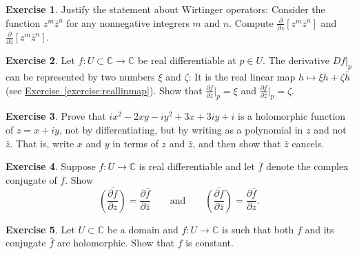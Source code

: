\documentclass[12pt,openany]{book}
\newcommand{\C}{{\mathbb{C}}}
\theoremstyle{plain}
\theoremstyle{remark}
\theoremstyle{definition}
\newenvironment{exbox}{%
    \def\FrameCommand{\vrule width 1pt \relax\hspace{10pt}}%
    \MakeFramed{\advance\hsize-\width\FrameRestore}%
}{%
    \endMakeFramed
}
\theoremstyle{exercise}
\newtheorem{exercise}{Exercise}[section]
\theoremstyle{example}
\newcommand{\exerciseref}[1]{\hyperref[#1]{Exercise~\ref*{#1}}}
\begin{document}
\begin{exbox}
\begin{exercise}
Justify the statement about Wirtinger operators:  Consider
the function $z^m\bar{z}^n$ for any nonnegative integrers $m$ and $n$.
Compute
$\frac{\partial}{\partial z} \left[ z^m\bar{z}^n \right]$
and
$\frac{\partial}{\partial \bar{z}} \left[ z^m\bar{z}^n \right]$.
\end{exercise}

\begin{exercise}
Let $f \colon U \subset \C \to \C$ be real differentiable at $p \in U$.
The derivative $Df|_{p}$ can be represented by two numbers $\xi$ and
$\zeta$: It is the real linear map $h \mapsto \xi h + \zeta \bar{h}$
(see \exerciseref{exercise:reallinmap}).
Show that $\frac{\partial f}{\partial z} \big|_p = \xi$ and
$\frac{\partial f}{\partial \bar{z}} \big|_p = \zeta$.
\end{exercise}

\begin{exercise}
Prove that $ix^2 - 2xy -iy^2 + 3x + 3iy + i$ is a holomorphic function of
$z = x+iy$, not by
differentiating, but by writing as a polynomial in $z$ and not $\bar{z}$.
That is, write $x$ and $y$ in terms of $z$ and $\bar{z}$, and then show
that $\bar{z}$ cancels.
\end{exercise}

\begin{exercise}%
\label{exercise:wirtingerandbar}
Suppose $f \colon U \to \C$ is real differentiable and let $\bar{f}$
denote the complex conjugate of $f$.  Show
\begin{equation*}
\overline{\left(\frac{\partial f}{\partial z}\right)} = 
\frac{\partial \bar{f}}{\partial \bar{z}}
\qquad \text{and} \qquad
\overline{\left(\frac{\partial f}{\partial \bar{z}}\right)} = 
\frac{\partial \bar{f}}{\partial z} .
\end{equation*}
\end{exercise}

\begin{exercise}
Let $U \subset \C$ be a domain and
$f \colon U \to \C$ is such that both $f$ and its conjugate
$\bar{f}$ are holomorphic.  Show that $f$ is constant.
\end{exercise}


\end{exbox}
\end{document}
